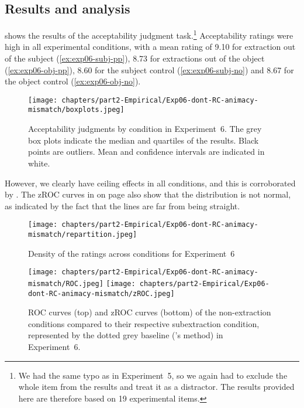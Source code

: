 \subsection{Results and analysis}\largerpage[2.25]

 shows the results of the acceptability judgment task.{\footnote{We had the same typo as in Experiment~5, so we again had to exclude the whole item from the results and treat it as a distractor. The results provided here are therefore based on 19 experimental items.}}
Acceptability ratings were high in all experimental conditions, with a mean rating of 9.10 for extraction out of the subject (\ref{ex:exp06-subj-pp}), 8.73 for extractions out of the object (\ref{ex:exp06-obj-pp}), 8.60 for the subject control (\ref{ex:exp06-subj-no}) and 8.67 for the object control (\ref{ex:exp06-obj-no}). 

\begin{figure}
    \centering
    \texttt{[image: chapters/part2-Empirical/Exp06-dont-RC-animacy-mismatch/boxplots.jpeg]}
    \caption{Acceptability judgments by condition in Experiment~6. The grey box plots indicate the median and quartiles of the results. Black points are outliers. Mean and confidence intervals are indicated in white.}
    \label{fig:exp06-boxplot}
\end{figure}

However, we clearly have ceiling effects in all conditions, and this is corroborated by . The zROC curves in  on page \pageref{fig:exp06-ROC} also show that the distribution is not normal, as indicated by the fact that the lines are far from being straight.

\begin{figure}
    \centering
    \texttt{[image: chapters/part2-Empirical/Exp06-dont-RC-animacy-mismatch/repartition.jpeg]}
    \caption{Density of the ratings across conditions for Experiment~6}
    \label{fig:exp06-repartition}
\end{figure}

\begin{figure}
    \centering
    \texttt{[image: chapters/part2-Empirical/Exp06-dont-RC-animacy-mismatch/ROC.jpeg]}
    \texttt{[image: chapters/part2-Empirical/Exp06-dont-RC-animacy-mismatch/zROC.jpeg]}
    \caption{ROC curves (top) and zROC curves (bottom) of the non-extraction conditions compared to their respective subextraction condition, represented by the dotted grey baseline (\citealt{Dillon.2019}'s method) in Experiment~6.}
    \label{fig:exp06-ROC}
\end{figure}

